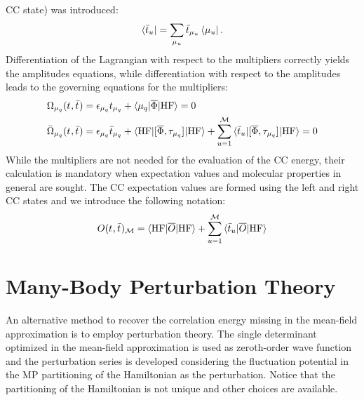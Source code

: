\acrshort*{CC} state) was introduced:
\begin{equation}
  \bra{\bar{t}_{u}} = \sum_{\mu_u}\bar{t}_{\mu_u}\bra{\mu_u}.
\end{equation}
Differentiation of the Lagrangian with respect to the multipliers
correctly yields the amplitudes equations, while differentiation with
respect to the amplitudes leads to the governing equations for the
multipliers:
\begin{subequations}
  \begin{align}
   \Omega_{\mu_q}(t_{}, \bar{t}_{})  &=
   \epsilon_{\mu_q}t_{\mu_q} + \braket{\mu_q | \overline{\Phi} | \mathrm{HF}}
             = 0 \label{eq:cc-amplitudes}\\
   \bar{\Omega}_{\mu_q}(t_{}, \bar{t}_{})
    &=
    \epsilon_{\mu_q}\bar{t}_{\mu_q} +
    \braket{\mathrm{HF} | [ \overline{\Phi}, \tau_{\mu_q} ]^{} | \mathrm{HF}} +
    \sum_{u=1}^{\mathcal{M}}\braket{\bar{t}_{u} |
    [ \overline{\Phi}, \tau_{\mu_q} ]^{} | \mathrm{HF}}
             = 0 \label{eq:cc-multipliers}
  \end{align}
\end{subequations}
While the multipliers are not needed for the evaluation of the
\acrshort{CC} energy, their calculation is mandatory when expectation values
and molecular properties in general are sought.
The \acrshort{CC} expectation values are formed using the left and
right \acrshort{CC} states and we introduce the following notation:
\begin{equation}\label{eq:cc-expectation-value}
  O(t_{}, \bar{t}_{})_\mathcal{M} = \braket{\mathrm{HF} | \overline{O} | \mathrm{HF} }
  + \sum_{u=1}^{\mathcal{M}}\braket{\bar{t}_{u} | \overline{O} | \mathrm{HF} }
\end{equation}

\section{Many-Body Perturbation Theory}\label{sec:mbpt}

An alternative method to recover the correlation energy missing in the
mean-field approximation is to employ perturbation
theory.\autocite{Konishi2009-zb}
The single determinant optimized in the mean-field approximation is used
as zeroth-order wave function and the perturbation series is developed
considering the fluctuation potential in the \acrlong*{MP} partitioning
of the Hamiltonian as the perturbation.\autocite{McWeeny1992-oj, Helgaker2000-tz}
Notice that the partitioning of the Hamiltonian is not unique and
other choices are available.\autocite{Shavitt2009-mr}

